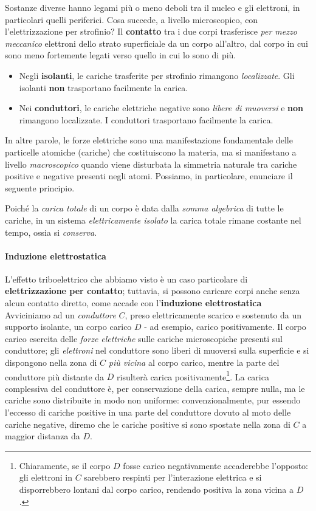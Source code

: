 Sostanze diverse hanno legami più o meno deboli tra il nucleo e gli elettroni, in particolari quelli periferici. Cosa succede, a livello microscopico, con l'elettrizzazione per strofinio? Il \textbf{contatto} tra i due corpi trasferisce \textit{per mezzo meccanico} elettroni dello strato superficiale da un corpo all'altro, dal corpo in cui sono meno fortemente legati verso quello in cui lo sono di più.
\begin{itemize}
	\item Negli \textbf{isolanti}, le cariche trasferite per strofinio rimangono \textit{localizzate}. Gli isolanti \textbf{non} trasportano facilmente la carica.
	\item Nei \textbf{conduttori}, le cariche elettriche negative sono \textit{libere di muoversi} e \textbf{non} rimangono localizzate. I conduttori trasportano facilmente la carica.
\end{itemize}
In altre parole, le forze elettriche sono una manifestazione fondamentale delle particelle atomiche (cariche) che costituiscono la materia, ma si manifestano a livello \textit{macroscopico} quando viene disturbata la simmetria naturale tra cariche positive e negative presenti negli atomi. Possiamo, in particolare, enunciare il seguente principio.
\begin{principle}
	 Poiché la \textit{carica totale} di un corpo è data dalla \textit{somma algebrica} di tutte le cariche, in un sistema \textit{elettricamente isolato} la carica totale rimane costante nel tempo, ossia si \textit{conserva}.
\end{principle}
\paragraph{Induzione elettrostatica}
L'effetto triboelettrico che abbiamo visto è un caso particolare di \textbf{elettrizzazione per contatto}; tuttavia, si possono caricare corpi anche senza alcun contatto diretto, come accade con l'\textbf{induzione elettrostatica}\\
Avviciniamo ad un \textit{conduttore} $C$, preso elettricamente scarico e sostenuto da un supporto isolante, un corpo carico $D$ - ad esempio, carico positivamente.
Il corpo carico esercita delle \textit{forze elettriche} sulle cariche microscopiche presenti sul conduttore; gli \textit{elettroni} nel conduttore sono liberi di muoversi sulla superficie e si dispongono nella zona di $C$ \textit{più vicina} al corpo carico, mentre la parte del conduttore più distante da $D$ risulterà carica positivamente\footnote{Chiaramente, se il corpo $D$ fosse carico negativamente accaderebbe l'opposto: gli elettroni in $C$ sarebbero respinti per l'interazione elettrica e si disporrebbero lontani dal corpo carico, rendendo positiva la zona vicina a $D$.}.
La carica complessiva del conduttore è, per conservazione della carica, sempre nulla, ma le cariche sono distribuite in modo non uniforme: convenzionalmente, pur essendo l'eccesso di cariche positive in una parte del conduttore dovuto al moto delle cariche negative, diremo che le cariche positive si sono spostate nella zona di $C$ a maggior distanza da $D$.

